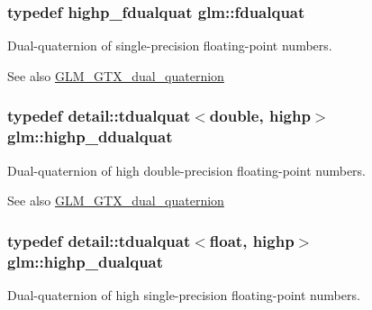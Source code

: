 \subsubsection[{\texorpdfstring{fdualquat}{fdualquat}}]{\setlength{\rightskip}{0pt plus 5cm}typedef highp\+\_\+fdualquat {\bf glm\+::fdualquat}}\hypertarget{group__gtc__dual__quaternion_ga436906129bc69ca5059555cafcbac9fd}{}\label{group__gtc__dual__quaternion_ga436906129bc69ca5059555cafcbac9fd}
Dual-\/quaternion of single-\/precision floating-\/point numbers.

\begin{DoxySeeAlso}{See also}
\hyperlink{group__gtc__dual__quaternion}{G\+L\+M\+\_\+\+G\+T\+X\+\_\+dual\+\_\+quaternion} 
\end{DoxySeeAlso}
\subsubsection[{\texorpdfstring{highp\+\_\+ddualquat}{highp_ddualquat}}]{\setlength{\rightskip}{0pt plus 5cm}typedef detail\+::tdualquat$<$double, highp$>$ {\bf glm\+::highp\+\_\+ddualquat}}\hypertarget{group__gtc__dual__quaternion_ga61b654c21f080135aedcf23461eb1037}{}\label{group__gtc__dual__quaternion_ga61b654c21f080135aedcf23461eb1037}
Dual-\/quaternion of high double-\/precision floating-\/point numbers.

\begin{DoxySeeAlso}{See also}
\hyperlink{group__gtc__dual__quaternion}{G\+L\+M\+\_\+\+G\+T\+X\+\_\+dual\+\_\+quaternion} 
\end{DoxySeeAlso}
\subsubsection[{\texorpdfstring{highp\+\_\+dualquat}{highp_dualquat}}]{\setlength{\rightskip}{0pt plus 5cm}typedef detail\+::tdualquat$<$float, highp$>$ {\bf glm\+::highp\+\_\+dualquat}}\hypertarget{group__gtc__dual__quaternion_gaf3a01deb502f53ca555ee1d45e6d6776}{}\label{group__gtc__dual__quaternion_gaf3a01deb502f53ca555ee1d45e6d6776}
Dual-\/quaternion of high single-\/precision floating-\/point numbers.

